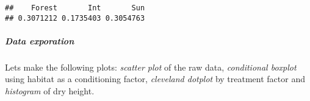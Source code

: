\documentclass[
]{article}
\newenvironment{Shaded}{\begin{snugshade}}{\end{snugshade}}
\newcommand{\FunctionTok}[1]{\textcolor[rgb]{0.00,0.00,0.00}{#1}}
\newcommand{\NormalTok}[1]{#1}
\newcommand{\OtherTok}[1]{\textcolor[rgb]{0.56,0.35,0.01}{#1}}
\newcommand{\SpecialCharTok}[1]{\textcolor[rgb]{0.00,0.00,0.00}{#1}}
\begin{document}
\begin{Shaded}
\end{Shaded}

\begin{verbatim}
##    Forest       Int       Sun 
## 0.3071212 0.1735403 0.3054763
\end{verbatim}

\hypertarget{data-exporation}{%
\subparagraph{Data exporation}\label{data-exporation}}

Lets make the following plots: \emph{scatter plot} of the raw data,
\emph{conditional boxplot} using habitat as a conditioning factor,
\emph{cleveland dotplot} by treatment factor and \emph{histogram} of dry
height.
\end{document}
